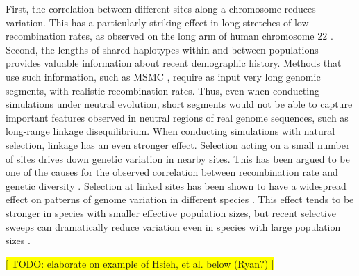 \documentclass[hidelinks]{article}
\begin{document}
First, the correlation between different sites along a chromosome reduces
variation. This has a particularly striking effect in long stretches of
low recombination rates, as observed on the long arm of human chromosome 22 \citep{Dawson2002}.
Second, the lengths of shared haplotypes within and
between populations provides valuable information about recent demographic history.
Methods that use such information, such as MSMC \citep{Schiffels2020}, require as
input very long genomic segments, with realistic recombination rates.
Thus, even when conducting simulations under neutral evolution, short segments
would not be able to capture important features observed in neutral regions of
real genome sequences, such as long-range linkage disequilibrium.
%
When conducting simulations with natural selection, linkage has
an even stronger effect. Selection acting on a small number of sites drives down
genetic variation in nearby sites. This has been argued to be one of the causes
for the observed correlation between recombination rate and genetic diversity
\citep{Begun1992}. Selection at linked sites has been shown to have a widespread
effect on patterns of genome variation in different species \citep{McVicker2009,Charlesworth2012}. This effect tends to be stronger in species
with smaller effective population sizes, but recent selective sweeps can dramatically
reduce variation even in species with large population sizes \citep{Lynd2010}.
%
%
%

\noindent\colorbox{yellow}{[ TODO: elaborate on example of Hsieh, et al. below (Ryan?) ]}
\end{document}
